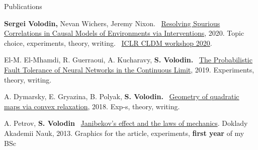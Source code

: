 \documentclass{resume} %
\newcommand*{\logo}[1]{%
	\raisebox{-.02\baselineskip}{%
		\texttt{[image: ./img/\#1]}%
	}%
}
\newcommand{\mylink}{{\color{gray}\faExternalLink}}
\begin{document}

\begin{rSection}{Publications}
\vspace{-1em}
\item \logo{iclr.png} {\bf Sergei Volodin,} Nevan Wichers, Jeremy Nixon. \mylink~\href{https://arxiv.org/pdf/2002.05217.pdf}{Resolving Spurious Correlations in Causal Models of Environments via Interventions}, 2020. Topic choice, experiments, theory, writing. \mylink~\href{https://causalrlworkshop.github.io/program/cldm_8.html}{ICLR CLDM workshop 2020}.
\item El-M. El-Mhamdi, R. Guerraoui, A. Kucharavy, {\bf \color{grayheading} S. Volodin.} \mylink~\href{https://arxiv.org/abs/1902.01686}{The Probabilistic Fault Tolerance of Neural Networks in the Continuous Limit}, 2019. Experiments, theory,  writing. %
\item A. Dymarsky, E. Gryazina, B. Polyak, {\bf \color{grayheading} S. Volodin.} \mylink~\href{https://arxiv.org/pdf/1810.00896.pdf}{Geometry of quadratic maps via convex relaxation}, 2018. Exp-s, theory, writing.%
\item A. Petrov, {\bf \color{grayheading} S. Volodin} \mylink~\href{https://link.springer.com/article/10.1134/S1028335813080041}{Janibekov's effect and the laws of mechanics}. Doklady Akademii Nauk, 2013. Graphics for the article, experiments, {\bf first year} of my BSc
\end{rSection}
\end{document}
